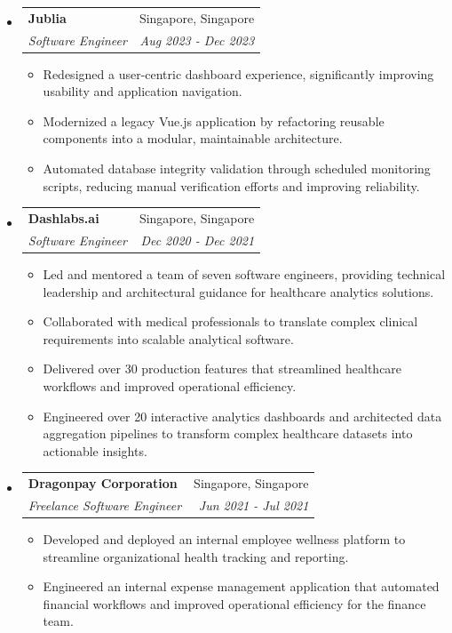 \documentclass[letterpaper,11pt]{article}
\makeatletter
\newcommand{\resitem}[1]{\item #1 \vspace{-2pt}}
\newcommand{\ressubheading}[4]{
    \begin{tabular*}{6.5in}{p{4.8in}@{\extracolsep{\fill}}r}
            \textbf{#1} & #2 \\
            \textit{#3} & \textit{#4} \\
    \end{tabular*}\vspace{-8pt}}
\makeatother
\begin{document}
\begin{itemize}
        \begin{itemize}
            \resitem{Collaborated with university faculty to architect and deliver an AI-powered learning platform enhancing educational workflows and student engagement.}
            \resitem{Engineered a modular application framework configurable for multiple university courses.}
            \resitem{Defined the application's system architecture and relational database design, prioritizing scalability and long-term extensibility.}
        \end{itemize}
        \item \ressubheading{Jublia}{Singapore, Singapore}{Software Engineer}{Aug 2023 - Dec 2023}
        \begin{itemize}
            \resitem{Redesigned a user-centric dashboard experience, significantly improving usability and application navigation.}
            \resitem{Modernized a legacy Vue.js application by refactoring reusable components into a modular, maintainable architecture.}
            \resitem{Automated database integrity validation through scheduled monitoring scripts, reducing manual verification efforts and improving reliability.}
        \end{itemize}
        \item \ressubheading{Dashlabs.ai}{Singapore, Singapore}{Software Engineer}{Dec 2020 - Dec 2021}
        \begin{itemize}
            \resitem{Led and mentored a team of seven software engineers, providing technical leadership and architectural guidance for healthcare analytics solutions.}
            \resitem{Collaborated with medical professionals to translate complex clinical requirements into scalable analytical software.}
            \resitem{Delivered over 30 production features that streamlined healthcare workflows and improved operational efficiency.}
            \resitem{Engineered over 20 interactive analytics dashboards and architected data aggregation pipelines to transform complex healthcare datasets into actionable insights.}
        \end{itemize}
        \item \ressubheading{Dragonpay Corporation}{Singapore, Singapore}{Freelance Software Engineer}{Jun 2021 - Jul 2021}
        \begin{itemize}
            \resitem{Developed and deployed an internal employee wellness platform to streamline organizational health tracking and reporting.}
            \resitem{Engineered an internal expense management application that automated financial workflows and improved operational efficiency for the finance team.}

\end{itemize}
\end{itemize}
\end{document}
